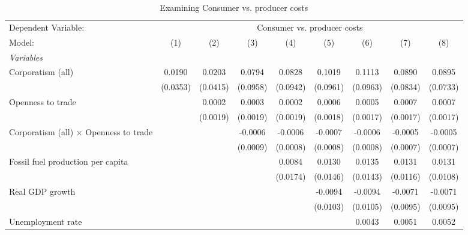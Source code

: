 
\begin{table}[htbp]
   \caption{Examining Consumer vs. producer costs}
   \centering
   \begin{tabular}{lcccccccc}
      \tabularnewline \midrule \midrule
      Dependent Variable: & \multicolumn{8}{c}{Consumer vs. producer costs}\\
      Model:                                        & (1)      & (2)      & (3)      & (4)      & (5)      & (6)      & (7)      & (8)\\  
      \midrule
      \emph{Variables}\\
      Corporatism (all)                             & 0.0190   & 0.0203   & 0.0794   & 0.0828   & 0.1019   & 0.1113   & 0.0890   & 0.0895\\   
                                                    & (0.0353) & (0.0415) & (0.0958) & (0.0942) & (0.0961) & (0.0963) & (0.0834) & (0.0733)\\   
      Openness to trade                             &          & 0.0002   & 0.0003   & 0.0002   & 0.0006   & 0.0005   & 0.0007   & 0.0007\\   
                                                    &          & (0.0019) & (0.0019) & (0.0019) & (0.0018) & (0.0017) & (0.0017) & (0.0017)\\   
      Corporatism (all) $\times$ Openness to trade  &          &          & -0.0006  & -0.0006  & -0.0007  & -0.0006  & -0.0005  & -0.0005\\   
                                                    &          &          & (0.0009) & (0.0008) & (0.0008) & (0.0008) & (0.0007) & (0.0007)\\   
      Fossil fuel production per capita             &          &          &          & 0.0084   & 0.0130   & 0.0135   & 0.0131   & 0.0131\\   
                                                    &          &          &          & (0.0174) & (0.0146) & (0.0143) & (0.0116) & (0.0108)\\   
      Real GDP growth                               &          &          &          &          & -0.0094  & -0.0094  & -0.0071  & -0.0071\\   
                                                    &          &          &          &          & (0.0103) & (0.0105) & (0.0095) & (0.0095)\\   
      Unemployment rate                             &          &          &          &          &          & 0.0043   & 0.0051   & 0.0052\\   

\end{tabular}
\end{table}
